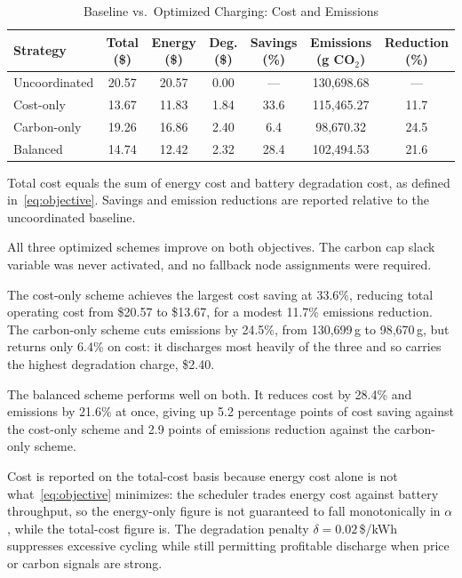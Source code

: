 \documentclass[sustainability,article,submit,moreauthors,pdftex]{Definitions/mdpi}
\begin{document}
\begin{table}[tbp]
\centering
\caption{Baseline vs.\ Optimized Charging: Cost and Emissions}
\label{tab:baseline_comparison}
\small
\setlength{\tabcolsep}{5pt}
\begin{tabular}{lcccccc}
\toprule
\textbf{Strategy}
  & \makecell{Total\\(\$)}
  & \makecell{Energy\\(\$)}
  & \makecell{Deg.\\(\$)}
  & \makecell{Savings\\(\%)}
  & \makecell{Emissions\\(g CO$_2$)}
  & \makecell{Reduction\\(\%)} \\
\midrule
Uncoordinated & 20.57 & 20.57 & 0.00 & ---  & 130,698.68 & ---  \\
Cost-only     & 13.67 & 11.83 & 1.84 & 33.6 & 115,465.27 & 11.7 \\
Carbon-only   & 19.26 & 16.86 & 2.40 &  6.4 &  98,670.32 & 24.5 \\
Balanced      & 14.74 & 12.42 & 2.32 & 28.4 & 102,494.53 & 21.6 \\
\bottomrule
\end{tabular}

\vspace{4pt}

{\footnotesize Total cost equals the sum of energy cost and battery degradation cost, as defined in~\eqref{eq:objective}. Savings and emission reductions are reported relative to the uncoordinated baseline.}
\end{table}

All three optimized schemes improve on both objectives. The carbon cap slack variable was never activated, and no fallback node assignments were required.

The cost-only scheme achieves the largest cost saving at 33.6\%, reducing total operating cost from \$20.57 to \$13.67, for a modest 11.7\% emissions reduction. The carbon-only scheme cuts emissions by 24.5\%, from 130{,}699\,g to 98{,}670\,g, but returns only 6.4\% on cost: it discharges most heavily of the three and so carries the highest degradation charge, \$2.40.

The balanced scheme performs well on both. It reduces cost by 28.4\% and emissions by 21.6\% at once, giving up 5.2 percentage points of cost saving against the cost-only scheme and 2.9 points of emissions reduction against the carbon-only scheme.

Cost is reported on the total-cost basis because energy cost alone is not what~\eqref{eq:objective} minimizes: the scheduler trades energy cost against battery throughput, so the energy-only figure is not guaranteed to fall monotonically in $\alpha$, while the total-cost figure is. The degradation penalty $\delta = 0.02$\,\$/kWh suppresses excessive cycling while still permitting profitable discharge when price or carbon signals are strong.
\end{document}
